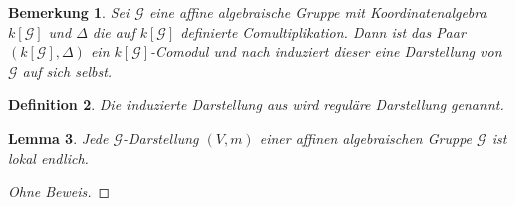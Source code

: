 \documentclass[a4paper, 11pt]{scrartcl}
\theoremstyle{basicstyle}
\newtheorem{definition}{Definition}[section]
\newtheorem{bemerkung}[definition]{Bemerkung}
\newtheorem{lemma}[definition]{Lemma}
\begin{document}
    \begin{bemerkung}\label{bem:3}
        Sei \(\mathcal{G}\) eine affine algebraische Gruppe mit Koordinatenalgebra \(k[\mathcal{G}]\) und \(\Delta\) die auf \(k[\mathcal{G}]\) definierte Comultiplikation.
        Dann ist das Paar \((k[\mathcal{G}], \Delta)\) ein \(k[\mathcal{G}]\)-Comodul und nach  induziert dieser eine Darstellung von \(\mathcal{G}\) auf sich selbst.
    \end{bemerkung}

    \begin{definition}
        Die induzierte Darstellung aus  wird \emph{reguläre Darstellung} genannt.
    \end{definition}

    \begin{lemma}\label{lem:2}
        Jede \(\mathcal{G}\)-Darstellung \((V, m)\) einer affinen algebraischen Gruppe \(\mathcal{G}\) ist lokal endlich.
    \end{lemma}
    \begin{proof}[Ohne Beweis]
    \end{proof}
\end{document}
